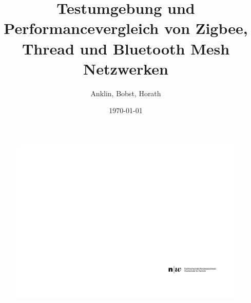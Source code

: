 \documentclass[final]{fhnwreport}       %
\title{Testumgebung und Performancevergleich von Zigbee, Thread und Bluetooth Mesh Netzwerken}  		        %
\author{Anklin, Bobst, Horath}      				    %
\date{\today}          				   %
\begin{document}
\thispagestyle{empty}
	\begin{figure}
		 \vspace*{-\topskip}\vspace*{-\headsep}
		\includegraphics[scale=1]{graphics/fhnw_ht_logo_de.pdf}
	\end{figure}
\end{document}
